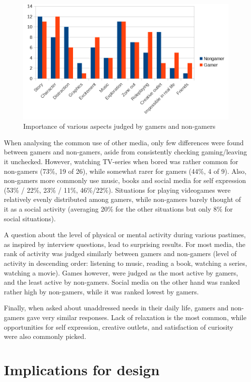 \documentclass[]{vutinfth}
\begin{document}
\begin{figure}
\centering
\includegraphics{images/important-aspects.png}
\caption{Importance of various aspects judged by gamers and non-gamers}
\end{figure}

When analysing the common use of other media, only few differences were
found between gamers and non-gamers, aside from consistently checking
gaming/leaving it unchecked. However, watching TV-series when bored was
rather common for non-gamers (73\%, 19 of 26), while somewhat rarer for
gamers (44\%, 4 of 9). Also, non-gamers more commonly use music, books
and social media for self expression (53\% / 22\%, 23\% / 11\%,
46\%/22\%). Situations for playing videogames were relatively evenly
distributed among gamers, while non-gamers barely thought of it as a
social activity (averaging 20\% for the other situations but only 8\%
for social situations).

A question about the level of physical or mental activity during various
pastimes, as inspired by interview questions, lead to surprising
results. For most media, the rank of activity was judged similarly
between gamers and non-gamers (level of activity in descending order:
listening to music, reading a book, watching a series, watching a
movie). Games however, were judged as the most active by gamers, and the
least active by non-gamers. Social media on the other hand was ranked
rather high by non-gamers, while it was ranked lowest by gamers.

Finally, when asked about unaddressed needs in their daily life, gamers
and non-gamers gave very similar responses. Lack of relaxation is the
most common, while opportunities for self expression, creative outlets,
and satisfaction of curiosity were also commonly picked.

\hypertarget{implications-for-design}{%
\section{Implications for design}\label{implications-for-design}}
\end{document}
